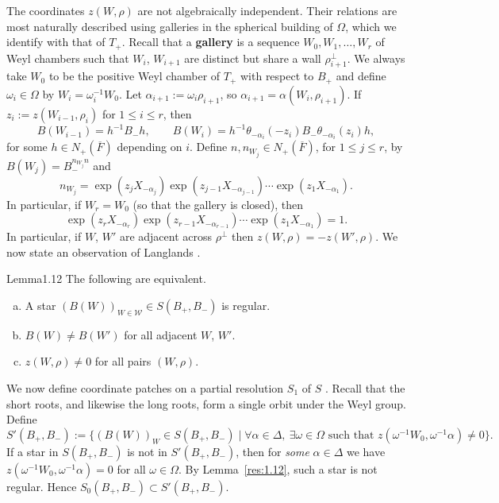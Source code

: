 \documentclass[12pt,letterpaper]{amsart}
\theoremstyle{plain}
\theoremstyle{definition}
\theoremstyle{remark}
\theoremstyle{definition}
\begin{document}
The coordinates $z(W,\rho)$ are not algebraically independent.
Their relations are most naturally
described using galleries in the spherical building
of $\Omega$, which we identify with that of $T_+$.
Recall that a \textbf{gallery} is a sequence $W_0,W_1,\dots, W_r$
of Weyl chambers such that $W_i$, $W_{i+1}$ are distinct but share a wall
$\rho_{i+1}^\perp$. We always take $W_0$ to be the positive Weyl chamber of
$T_+$ with respect to $B_+$ and define
$\omega_i\in\Omega$ by
$W_i=\omega_i^{-1}W_0$. Let $\alpha_{i+1}:=\omega_i\rho_{i+1}$,
so $\alpha_{i+1}=\alpha(W_i,\rho_{i+1})$. If $z_i:=z(W_{i-1},\rho_i)$
for $1\leq i\leq r$,
then
\begin{equation}\tag{1.9}\label{eq:1.9}
B(W_{i-1})=h^{-1}B_-h,\qquad
B(W_i)=h^{-1}\theta_{-\alpha_i}(-z_i)
B_-\theta_{-\alpha_i}(z_i)h,
\end{equation}
for some $h\in N_+(\overline{F})$ depending on $i$. Define
$n,n_{W_j}\in N_+(\overline{F})$, for $1\leq j\leq r$, by
$B(W_j)=B_-^{n_{W_j}n}$ and
\begin{equation}\tag{1.10}\label{eq:1.10}
n_{W_j}=\exp (z_jX_{-\alpha_j})
\exp (z_{j-1}X_{-\alpha_{j-1}})\cdots \exp (z_1X_{-\alpha_1}).
\end{equation}
In particular, if $W_r=W_0$ (so that the gallery is closed),
then
\begin{equation}\tag{1.11}\label{eq:1.11}
\exp (z_rX_{-\alpha_r})
\exp (z_{r-1}X_{-\alpha_{r-1}})\cdots \exp (z_1X_{-\alpha_1})=1.
\end{equation}
In particular, if $W$, $W'$ are adjacent across
$\rho^\perp$ then $z(W,\rho)=-z(W',\rho)$.
We now state an observation of Langlands \cite[pp.~483--484]{La83}.

\begin{res}{Lemma}{1.12}\label{res:1.12}
The following are equivalent.
\begin{enumerate}[(a)]
\item A star $(B(W))_{W\in{\mathcal W}}\in S(B_+,B_-)$ is regular.
\item $B(W)\not= B(W')$ for all adjacent $W$, $W'$.
\item $z(W,\rho)\not= 0$ for all pairs $(W,\rho)$.
\end{enumerate}
\end{res}

We now define coordinate patches on a partial resolution $S_1$ of $S$
\cite{Ha92a}. Recall that the short roots, and likewise the long roots,
form a single orbit under the Weyl group. Define
\[
S'(B_+,B_-):=\{(B(W))_{W}\in S(B_+,B_-)
\mid \forall \alpha\in\Delta ,\ \exists \omega\in\Omega
\text{ such that }z(\omega^{-1}W_0,\omega^{-1}\alpha)\not= 0\}.
\]
If a star in $S(B_+,B_-)$ is not in
$S'(B_+,B_-)$, then for \emph{some} $\alpha\in\Delta$ we have
$z(\omega^{-1}W_0,\omega^{-1}\alpha)=0$
for all $\omega\in\Omega$. By Lemma~\ref{res:1.12},
such a star is not regular. Hence $S_0(B_+,B_-)\subset S'(B_+,B_-)$.
\end{document}

